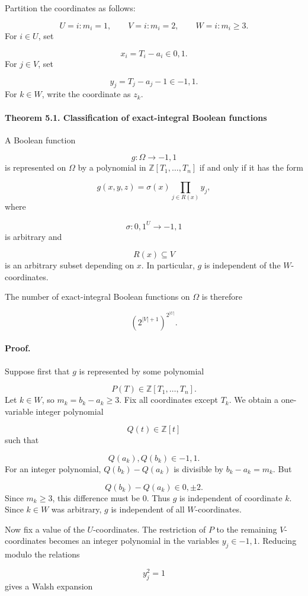 \documentclass[11pt]{article}
\theoremstyle{definition}
\begin{document}
Partition the coordinates as follows:

\[
U={i:m_i=1},
\qquad
V={i:m_i=2},
\qquad
W={i:m_i\ge3}.
\]
For $i\in U$, set

\[
x_i=T_i-a_i\in{0,1}.
\]
For $j\in V$, set

\[
y_j=T_j-a_j-1\in{-1,1}.
\]
For $k\in W$, write the coordinate as $z_k$.

\paragraph{Theorem 5.1. Classification of exact-integral Boolean functions}
A Boolean function

\[
g:\Omega\to{-1,1}
\]
is represented on $\Omega$ by a polynomial in $\mathbb{Z}[T_1,\dots,T_n]$ if and only if it has the form

\[
g(x,y,z)
=
\sigma(x)\prod_{j\in R(x)}y_j,
\]
where

\[
\sigma:{0,1}^{U}\to{-1,1}
\]
is arbitrary and

\[
R(x)\subseteq V
\]
is an arbitrary subset depending on $x$. In particular, $g$ is independent of the $W$-coordinates.

The number of exact-integral Boolean functions on $\Omega$ is therefore

\[
\left(2^{|V|+1}\right)^{2^{|U|}}.
\]
\paragraph{Proof.}
Suppose first that $g$ is represented by some polynomial

\[
P(T)\in\mathbb{Z}[T_1,\dots,T_n].
\]
Let $k\in W$, so $m_k=b_k-a_k\ge3$. Fix all coordinates except $T_k$. We obtain a one-variable integer polynomial

\[
Q(t)\in\mathbb{Z}[t]
\]
such that

\[
Q(a_k),Q(b_k)\in{-1,1}.
\]
For an integer polynomial, $Q(b_k)-Q(a_k)$ is divisible by $b_k-a_k=m_k$. But

\[
Q(b_k)-Q(a_k)\in{0,\pm2}.
\]
Since $m_k\ge3$, this difference must be $0$. Thus $g$ is independent of coordinate $k$. Since $k\in W$ was arbitrary, $g$ is independent of all $W$-coordinates.

Now fix a value of the $U$-coordinates. The restriction of $P$ to the remaining $V$-coordinates becomes an integer polynomial in the variables $y_j\in{-1,1}$. Reducing modulo the relations

\[
y_j^2=1
\]
gives a Walsh expansion
\end{document}
